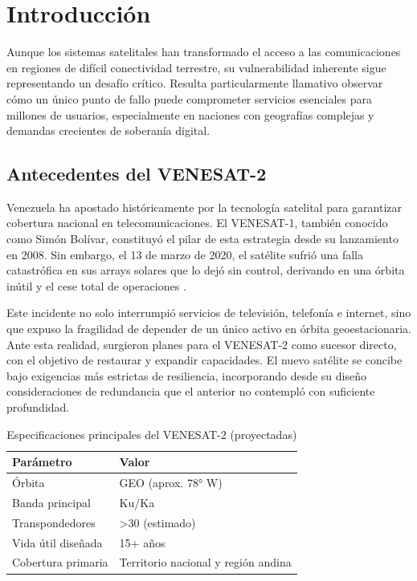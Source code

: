 \section{Introducción}

Aunque los sistemas satelitales han transformado el acceso a las comunicaciones en regiones de difícil conectividad terrestre, su vulnerabilidad inherente sigue representando un desafío crítico. Resulta particularmente llamativo observar cómo un único punto de fallo puede comprometer servicios esenciales para millones de usuarios, especialmente en naciones con geografías complejas y demandas crecientes de soberanía digital.

\subsection{Antecedentes del VENESAT-2}

Venezuela ha apostado históricamente por la tecnología satelital para garantizar cobertura nacional en telecomunicaciones. El VENESAT-1, también conocido como Simón Bolívar, constituyó el pilar de esta estrategia desde su lanzamiento en 2008. Sin embargo, el 13 de marzo de 2020, el satélite sufrió una falla catastrófica en sus arrays solares que lo dejó sin control, derivando en una órbita inútil y el cese total de operaciones \cite{VenesatStatus2020}. 

Este incidente no solo interrumpió servicios de televisión, telefonía e internet, sino que expuso la fragilidad de depender de un único activo en órbita geoestacionaria. Ante esta realidad, surgieron planes para el VENESAT-2 como sucesor directo, con el objetivo de restaurar y expandir capacidades. El nuevo satélite se concibe bajo exigencias más estrictas de resiliencia, incorporando desde su diseño consideraciones de redundancia que el anterior no contempló con suficiente profundidad.

\begin{table}[h]
\centering
\caption{Especificaciones principales del VENESAT-2 (proyectadas)}
\label{tab:venesat2_specs}
\begin{tabular}{ll}
\hline
\textbf{Parámetro} & \textbf{Valor} \\
\hline
Órbita & GEO (aprox. 78° W) \\
Banda principal & Ku/Ka \\
Transpondedores & >30 (estimado) \\
Vida útil diseñada & 15+ años \\
Cobertura primaria & Territorio nacional y región andina \\
\hline
\end{tabular}
\end{table}

